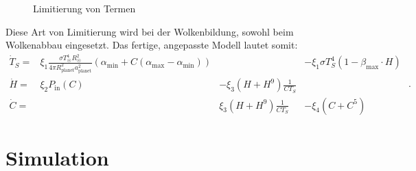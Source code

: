 \begin{refsection}
\begin{figure}[!h]
	\caption{Limitierung von Termen}
	\label{planeten:limit_graph}
\end{figure}
Diese Art von Limitierung wird bei der Wolkenbildung, sowohl beim Wolkenabbau eingesetzt. Das fertige, angepasste Modell lautet somit:
\begin{equation}
\begin{matrix}
\dot{T}_S = & \xi_1 \frac{\sigma T_{\astrosun}^4 R_{\astrosun}^2}{4 \pi R_{\text{planet}}^2 a_{\text{planet}}^2} (\alpha_{\text{min}} + C(\alpha_{\text{max}} - \alpha_{\text{min}})) && - \xi_1 \sigma T_{S}^4  (1 - \beta_{\text{max}} \cdot H)\\
\dot{H}   = & \xi_2 P_{\text{in}}(C) & - \xi_3 (H + H^9) \frac{1}{C T_S}   &                   \\
\dot{C}   = &                        &   \xi_3 (H + H^9) \frac{1}{C T_S}   & - \xi_4 (C + C^5)
\end{matrix} \text{ .}
\end{equation}

\section{Simulation}


\end{refsection}
